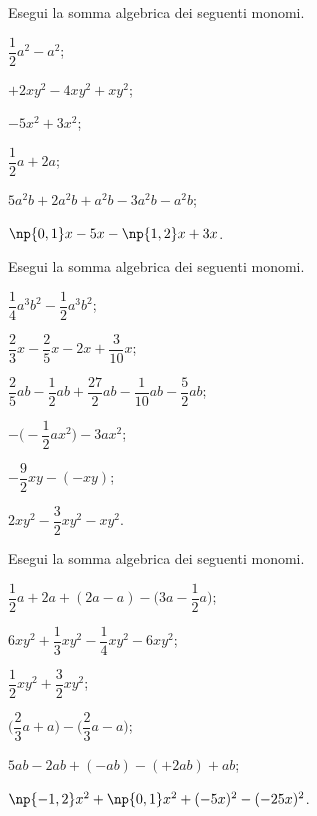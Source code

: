 \begin{esercizio}
 \label{ese:9.28}
Esegui la somma algebrica dei seguenti monomi.
\begin{multicols}{2}
\begin{enumeratea}
 \item $\dfrac{1}{2}a^{2}-a^{2}$;
 \item $+2xy^{2}-4xy^{2}+xy^{2}$;
 \item $-5x^{2}+3x^{2}$;
 \item $\dfrac{1}{2}a+2a$;
 \item $5a^{2}b+2a^{2}b+a^{2}b-3a^{2}b-a^{2}b$;
 \item $\np{0,1}x-5x-\np{1,2}x+3x$.
\end{enumeratea}
\end{multicols}
\end{esercizio}

\begin{esercizio}
 \label{ese:9.29}
Esegui la somma algebrica dei seguenti monomi.
\begin{multicols}{2}
\begin{enumeratea}
\spazielenx
 \item $\dfrac{1}{4}a^{3}b^{2}-\dfrac{1}{2}a^{3}b^{2}$;
 \item $\dfrac{2}{3}x-\dfrac{2}{5}x-2x+\dfrac{3}{10}x$;
 \item $\dfrac{2}{5}ab-\dfrac{1}{2}ab+\dfrac{27}{2}ab-\dfrac{1}{10}ab-\dfrac{5}{2}ab$;
 \item $-\bigg(-{\dfrac{1}{2}}ax^{2}\bigg)-3ax^{2}$;
 \item $-{\dfrac{9}{2}}xy-(-xy)$;
 \item $2xy^{2}-\dfrac{3}{2}xy^{2}-xy^{2}$.
\end{enumeratea}
\end{multicols}
\end{esercizio}

\begin{esercizio}
 \label{ese:9.30}
Esegui la somma algebrica dei seguenti monomi.
\begin{multicols}{2}
\begin{enumeratea}
\spazielenx
 \item $\dfrac{1}{2}a+2a+(2a-a)-\bigg(3a-\dfrac{1}{2}a\bigg)$;
 \item $6xy^{2}+\dfrac{1}{3}xy^{2}-\dfrac{1}{4}xy^{2}-6xy^{2}$;
 \item $\dfrac{1}{2}xy^{2}+\dfrac{3}{2}xy^{2}$;
 \item $\bigg(\dfrac{2}{3}a+a\bigg)-\bigg(\dfrac{2}{3}a-a\bigg)$;
 \item $5ab-2ab+(-ab)-(+2ab)+ab$;
 \item $\np{-1,2}x^{2}+\np{0,1}x^{2}+(-5x)^{2}-(-25x)^{2}$.
\end{enumeratea}
\end{multicols}

\end{esercizio}



